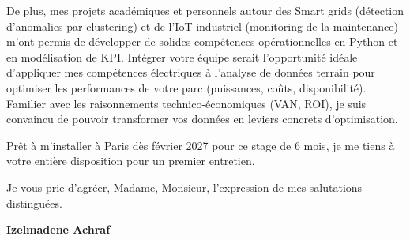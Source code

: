 \documentclass[10pt,a4paper]{../../altacv}
\begin{document}
\vspace{0.4cm}

De plus, mes projets académiques et personnels autour des Smart grids (détection d'anomalies par clustering) et de l'IoT industriel (monitoring de la maintenance) m'ont permis de développer de solides compétences opérationnelles en Python et en modélisation de KPI. Intégrer votre équipe serait l'opportunité idéale d'appliquer mes compétences électriques à l'analyse de données terrain pour optimiser les performances de votre parc (puissances, coûts, disponibilité). Familier avec les raisonnements technico-économiques (VAN, ROI), je suis convaincu de pouvoir transformer vos données en leviers concrets d'optimisation. 

\vspace{0.4cm}

Prêt à m'installer à Paris dès février 2027 pour ce stage de 6 mois, je me tiens à votre entière disposition pour un premier entretien. 

\vspace{0.5cm}

Je vous prie d'agréer, Madame, Monsieur, l'expression de mes salutations distinguées.

\vfill

\begin{flushright}
  \Large\color{emphasis}\textbf{Izelmadene Achraf}
\end{flushright}
\end{document}
